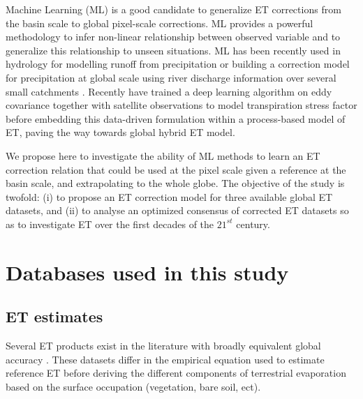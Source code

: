 \documentclass[draft]{agujournal2019}
\begin{document}
Machine Learning (ML) is a good candidate to generalize ET corrections from the basin scale to global pixel-scale corrections. 
ML provides a powerful methodology to infer non-linear relationship between observed variable and to generalize this relationship to unseen situations. 
ML has been recently used in hydrology for modelling runoff from precipitation \cite{Kratzert2018} 
or building a correction model for precipitation at global scale using river discharge information over several small catchments \cite{Beck2020}. 
Recently \cite{Koppa2022} have trained a deep learning algorithm on eddy covariance together with satellite observations to model transpiration stress factor before embedding this data-driven formulation within a process-based model of ET, paving the way towards global hybrid ET model.

We propose here to investigate the ability of ML methods to learn an ET correction relation that could be used at the pixel scale given a reference at the basin scale, 
and extrapolating to the whole globe. 
The objective of the study is twofold: 
(i) to propose an ET correction model for three available global ET datasets, and 
(ii) to analyse an optimized consensus of corrected ET datasets so as to investigate ET over the first decades of the $21^{st}$ century. 


\section{Databases used in this study}
\subsection{ET estimates}
Several ET products exist in the literature \cite{Mueller2011a,Zhang2017} with broadly equivalent global accuracy \cite{Michel2016,Miralles2016}. 
These datasets differ in the empirical equation used to estimate reference ET 
before deriving the different components of terrestrial evaporation based on the surface occupation (vegetation, bare soil, ect).
\end{document}
